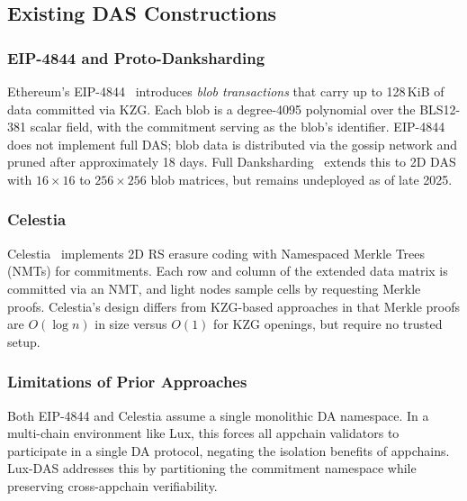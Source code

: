 \subsection{Existing DAS Constructions}

\subsubsection{EIP-4844 and Proto-Danksharding}

Ethereum's EIP-4844~\cite{eip4844} introduces \emph{blob transactions} that carry up to
128\,KiB of data committed via KZG. Each blob is a degree-4095 polynomial over the BLS12-381
scalar field, with the commitment serving as the blob's identifier. EIP-4844 does not implement
full DAS; blob data is distributed via the gossip network and pruned after approximately
18 days. Full Danksharding~\cite{dankrad2022danksharding} extends this to 2D DAS with
$16 \times 16$ to $256 \times 256$ blob matrices, but remains undeployed as of late 2025.

\subsubsection{Celestia}

Celestia~\cite{albassam2019lazyledger} implements 2D RS erasure coding with Namespaced Merkle
Trees (NMTs) for commitments. Each row and column of the extended data matrix is committed
via an NMT, and light nodes sample cells by requesting Merkle proofs. Celestia's design
differs from KZG-based approaches in that Merkle proofs are $O(\log n)$ in size versus
$O(1)$ for KZG openings, but require no trusted setup.

\subsubsection{Limitations of Prior Approaches}

Both EIP-4844 and Celestia assume a single monolithic DA namespace. In a multi-chain
environment like Lux, this forces all appchain validators to participate in a single DA
protocol, negating the isolation benefits of appchains. Lux-DAS addresses this by partitioning
the commitment namespace while preserving cross-appchain verifiability.



